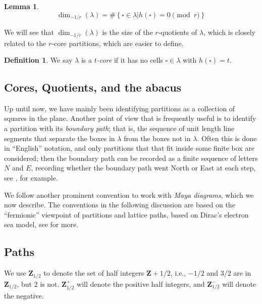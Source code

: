 \documentclass{amsart}[12pt]
\theoremstyle{definition}
\newtheorem{lemma}[dummy]{Lemma}
\newtheorem{definition}[dummy]{Definition}
\newcommand{\Z}{\mathbf{Z}}
\begin{document}
\begin{lemma}
$$\dim_{-1/r}(\lambda)=\#\left\{\square\in\lambda \Big | h(\square)=0 \pmod r\right\}$$
\end{lemma}

We will see that $\dim_{-1/r}(\lambda)$ is the size of the $r$-quotients of $\lambda$, which is closely related to the $r$-core partitions, which are easier to define.

\begin{definition} \label{def:tcore}
We say $\lambda$ is a \emph{$t$-core} if it has no cells $\square\in\lambda$ with $h(\square)=t$.
\end{definition}


\subsection{Cores, Quotients, and the abacus}  Up until now, we have mainly been identifying partitions as a collection of squares in the plane.  Another point of view that is frequently useful is to identify a partition with its \emph{boundary path}; that is, the sequence of unit length line segments that separate the boxes in $\lambda$ from the boxes not in $\lambda$.  Often this is done in ``English'' notation, and only partitions that that fit inside some finite box are considered; then the boundary path can be recorded as a finite sequence of letters $N$ and $E$, recording whether the boundary path went North or East at each step, see \cite{LW}, for example.

We follow another prominent convention to work with \emph{Maya diagrams}, which we now describe.  The conventions in the following discussion are based on the ``fermionic'' viewpoint of partitions and lattice paths, based on Dirac's electron sea model, see \cite{KR} for more. 


\subsection{Paths}

We use $\Z_{1/2}$ to denote the set of half integers $\Z+1/2$, i.e., $-1/2$ and $3/2$ are in $\Z_{1/2}$, but $2$ is not.  $\Z_{1/2}^+$ will denote the positive half integers, and $\Z_{1/2}^-$ will denote the negative.
\end{document}
